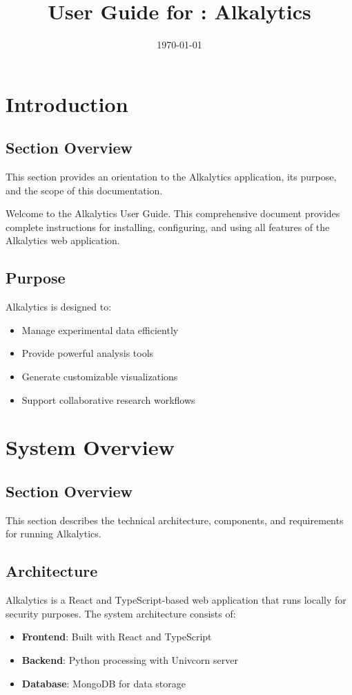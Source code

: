 \documentclass[12pt]{article}
\title{User Guide for \progname: Alkalytics}
\author{\authname}
\date{\today}
\begin{document}
\maketitle
\newpage
\tableofcontents
\newpage

\section{Introduction}
\subsection*{Section Overview}
This section provides an orientation to the Alkalytics application, its purpose,
and the scope of this documentation.

Welcome to the Alkalytics User Guide. This comprehensive document provides
complete instructions for installing, configuring, and using all features of the
Alkalytics web application.

\subsection{Purpose}
Alkalytics is designed to:
\begin{itemize}
\item Manage experimental data efficiently
\item Provide powerful analysis tools
\item Generate customizable visualizations
\item Support collaborative research workflows
\end{itemize}

\section{System Overview}
\subsection*{Section Overview}
This section describes the technical architecture, components, and requirements
for running Alkalytics.

\subsection{Architecture}
Alkalytics is a React and TypeScript-based web application that runs locally for
security purposes. The system architecture consists of:

\begin{itemize}
\item \textbf{Frontend}: Built with React and TypeScript
\item \textbf{Backend}: Python processing with Univcorn server
\item \textbf{Database}: MongoDB for data storage
\end{itemize}
\end{document}
